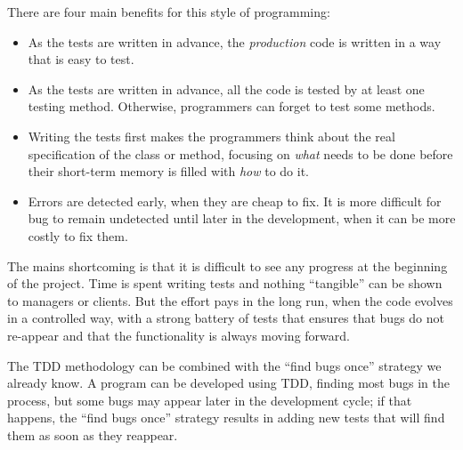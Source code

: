 There are four main benefits for this style of programming:

\begin{itemize}
\item As the tests are written in advance, the \emph{production} code
  is written in a way that is easy to test.
\item As the tests are written in advance, all the code is tested by
  at least one testing method. Otherwise, programmers can forget to
  test some methods.
\item Writing the tests first makes the programmers think about the
  real specification of the class or method, focusing on \emph{what}
  needs to be done before their short-term memory is filled with
  \emph{how} to do it.
\item Errors are detected early, when they are cheap to fix. It is
  more difficult for bug to remain undetected until later in the
  development, when it can be more costly to fix them.
\end{itemize}

The mains shortcoming is that it is difficult to see any progress at
the beginning of the project. Time is spent writing tests and nothing
``tangible'' can be shown to managers or clients. But the effort pays
in the long run, when the code evolves in a controlled way, with a
strong battery of tests that ensures that bugs do not re-appear and
that the functionality is always moving forward. 

The TDD methodology can be combined with the ``find bugs once'' strategy
we already know. A program can be developed using TDD, finding most
bugs in the process, but some bugs may appear later in the development
cycle; if that happens, the ``find bugs once'' strategy results in
adding new tests that will find them as soon as they reappear.


